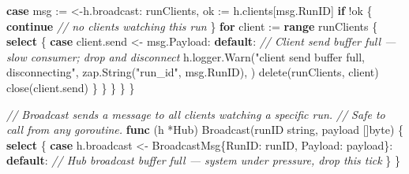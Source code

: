 \documentclass[
]{article}
\newenvironment{Shaded}{}{}
\newcommand{\BuiltInTok}[1]{\textcolor[rgb]{0.00,0.50,0.00}{#1}}
\newcommand{\CommentTok}[1]{\textcolor[rgb]{0.38,0.63,0.69}{\textit{#1}}}
\newcommand{\ControlFlowTok}[1]{\textcolor[rgb]{0.00,0.44,0.13}{\textbf{#1}}}
\newcommand{\DataTypeTok}[1]{\textcolor[rgb]{0.56,0.13,0.00}{#1}}
\newcommand{\KeywordTok}[1]{\textcolor[rgb]{0.00,0.44,0.13}{\textbf{#1}}}
\newcommand{\NormalTok}[1]{#1}
\newcommand{\OperatorTok}[1]{\textcolor[rgb]{0.40,0.40,0.40}{#1}}
\newcommand{\StringTok}[1]{\textcolor[rgb]{0.25,0.44,0.63}{#1}}
\begin{document}
\begin{Shaded}
\begin{Highlighting}[]
        \ControlFlowTok{case}\NormalTok{ msg }\OperatorTok{:=} \OperatorTok{\textless{}{-}}\NormalTok{h}\OperatorTok{.}\NormalTok{broadcast}\OperatorTok{:}
\NormalTok{            runClients}\OperatorTok{,}\NormalTok{ ok }\OperatorTok{:=}\NormalTok{ h}\OperatorTok{.}\NormalTok{clients}\OperatorTok{[}\NormalTok{msg}\OperatorTok{.}\NormalTok{RunID}\OperatorTok{]}
            \ControlFlowTok{if} \OperatorTok{!}\NormalTok{ok }\OperatorTok{\{}
                \ControlFlowTok{continue} \CommentTok{// no clients watching this run}
            \OperatorTok{\}}
            \ControlFlowTok{for}\NormalTok{ client }\OperatorTok{:=} \KeywordTok{range}\NormalTok{ runClients }\OperatorTok{\{}
                \ControlFlowTok{select} \OperatorTok{\{}
                \ControlFlowTok{case}\NormalTok{ client}\OperatorTok{.}\NormalTok{send }\OperatorTok{\textless{}{-}}\NormalTok{ msg}\OperatorTok{.}\NormalTok{Payload}\OperatorTok{:}
                \ControlFlowTok{default}\OperatorTok{:}
                    \CommentTok{// Client send buffer full — slow consumer; drop and disconnect}
\NormalTok{                    h}\OperatorTok{.}\NormalTok{logger}\OperatorTok{.}\NormalTok{Warn}\OperatorTok{(}\StringTok{"client send buffer full, disconnecting"}\OperatorTok{,}
\NormalTok{                        zap}\OperatorTok{.}\NormalTok{String}\OperatorTok{(}\StringTok{"run\_id"}\OperatorTok{,}\NormalTok{ msg}\OperatorTok{.}\NormalTok{RunID}\OperatorTok{),}
                    \OperatorTok{)}
                    \BuiltInTok{delete}\OperatorTok{(}\NormalTok{runClients}\OperatorTok{,}\NormalTok{ client}\OperatorTok{)}
                    \BuiltInTok{close}\OperatorTok{(}\NormalTok{client}\OperatorTok{.}\NormalTok{send}\OperatorTok{)}
                \OperatorTok{\}}
            \OperatorTok{\}}
        \OperatorTok{\}}
    \OperatorTok{\}}
\OperatorTok{\}}

\CommentTok{// Broadcast sends a message to all clients watching a specific run.}
\CommentTok{// Safe to call from any goroutine.}
\KeywordTok{func} \OperatorTok{(}\NormalTok{h }\OperatorTok{*}\NormalTok{Hub}\OperatorTok{)}\NormalTok{ Broadcast}\OperatorTok{(}\NormalTok{runID }\DataTypeTok{string}\OperatorTok{,}\NormalTok{ payload }\OperatorTok{[]}\DataTypeTok{byte}\OperatorTok{)} \OperatorTok{\{}
    \ControlFlowTok{select} \OperatorTok{\{}
    \ControlFlowTok{case}\NormalTok{ h}\OperatorTok{.}\NormalTok{broadcast }\OperatorTok{\textless{}{-}}\NormalTok{ BroadcastMsg}\OperatorTok{\{}\NormalTok{RunID}\OperatorTok{:}\NormalTok{ runID}\OperatorTok{,}\NormalTok{ Payload}\OperatorTok{:}\NormalTok{ payload}\OperatorTok{\}:}
    \ControlFlowTok{default}\OperatorTok{:}
        \CommentTok{// Hub broadcast buffer full — system under pressure, drop this tick}
    \OperatorTok{\}}
\OperatorTok{\}}
\end{Highlighting}
\end{Shaded}
\end{document}
